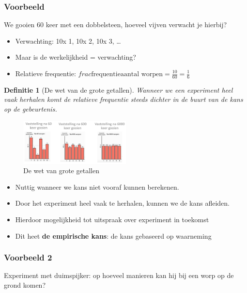 \documentclass{article}
\newtheorem{theorem}{Definitie}[section]
\begin{document}
\subsubsection{Voorbeeld}
We gooien 60 keer met een dobbelsteen, hoeveel vijven verwacht je hierbij?

\begin{itemize}
    \item Verwachting: 10x 1, 10x 2, 10x 3, \dots
    \item Maar is de werkelijkheid = verwachting?
    \item Relatieve frequentie: $frac{\text{frequentie}}{\text{aantal worpen}} = \frac{10}{60} = \frac16$
\end{itemize}

\begin{theorem}[De wet van de grote getallen]
    Wanneer we een experiment heel vaak herhalen komt de relatieve frequentie steeds dichter in de buurt van de kans op de gebeurtenis.
\end{theorem}

\begin{figure}[H]
    \centering
    \includegraphics[width=0.5\textwidth]{wet-grote-getallen.png}
    \caption{De wet van grote getallen}
\end{figure}

\begin{itemize}
    \item Nuttig wanneer we kans niet vooraf kunnen berekenen.
    \item Door het experiment heel vaak te herhalen, kunnen we de kans afleiden.
    \item Hierdoor mogelijkheid tot uitspraak over experiment in toekomst
    \item Dit heet \textbf{de empirische kans}: de kans gebaseerd op waarneming
\end{itemize}

\subsubsection{Voorbeeld 2}

Experiment met duimspijker: op hoeveel manieren kan hij bij een worp op de grond komen?
\end{document}

